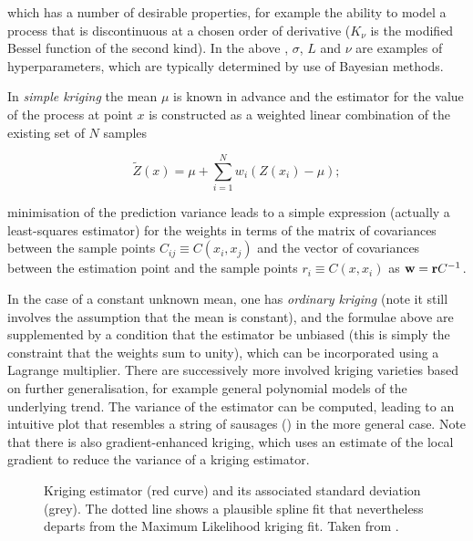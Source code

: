which has a number of desirable properties, for example the ability to model a process that is 
discontinuous at a chosen order of derivative ($K_{\nu}$ is the modified Bessel function of the 
second kind). In the above , $\sigma$, $L$ and $\nu$ are examples of
hyperparameters, which are typically determined by use of Bayesian methods.

In {\it simple kriging} the mean $\mu$ is known in advance and the estimator for the value of the 
process at point $x$ is constructed as a weighted linear combination of the existing set of $N$ 
samples

\begin{equation}
\tilde{Z}(x) = \mu + \sum_{i=1}^N w_i \left ( Z(x_i) - \mu \right );
\end{equation}

minimisation of the prediction variance leads to a simple expression (actually a least-squares 
estimator) for the weights in terms of the matrix of covariances between the sample points $C_{ij} 
\equiv C(x_i,x_j)$ and the vector of covariances between the estimation point and the sample points 
$r_i \equiv C(x, x_i)$ as ${\mathbf w} =  {\bf r} C^{-1}$.

In the case of a constant unknown mean, one has {\it ordinary kriging} (note it still involves the 
assumption that the mean is constant), and the formulae above are supplemented by a condition that 
the estimator be unbiased (this is simply the constraint that the weights sum to unity), which can 
be incorporated using a Lagrange multiplier.  
There are successively more involved kriging varieties based on further generalisation, for example 
general polynomial models of the underlying trend.  
The variance of the estimator can be computed, leading to an intuitive plot that resembles a string 
of sausages () in the more general case.  
Note that there is also gradient-enhanced kriging, which uses an estimate of the local gradient to 
reduce the variance of a kriging estimator.

\begin{figure}
\centerline{}
\caption{\label{fig:kriging}
Kriging estimator (red curve) and its associated standard deviation (grey).  
The dotted line shows a plausible spline fit that nevertheless departs from the Maximum 
Likelihood kriging fit.  Taken from \cite{krigingwiki}.}
\end{figure}

